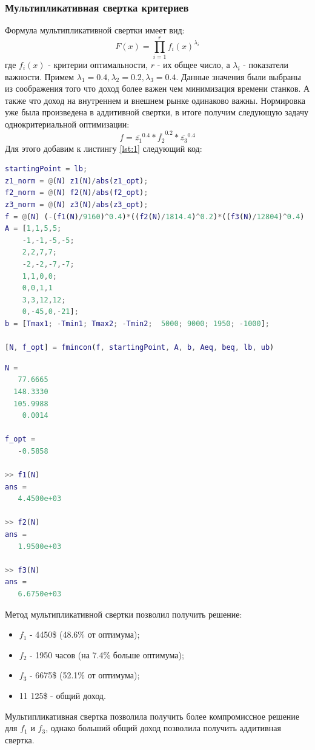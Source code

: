 \subsubsection{Мультипликативная свертка критериев}
Формула мультипликативной свертки имеет вид:
\begin{equation}
F(x) = \prod_{i=1}^{r}f_i(x)^{\lambda_i}
\end{equation}
где $f_i(x)$ - критерии оптимальности, $r$ - их общее число, а $\lambda_i$ - показатели важности. Примем $\lambda_1=0.4, \lambda_2=0.2, \lambda_3=0.4$. Данные значения были выбраны из соображения того что доход более важен чем минимизация времени станков. А также что доход на внутреннем и внешнем рынке одинаково важны.  Нормировка уже была произведена в аддитивной свертки, в итоге получим следующую задачу однокритериальной оптимизации:
\begin{equation}
f = \overline{z_1}^{0.4}*\overline{f_2}^{0.2}*\overline{z_3}^{0.4}
\end{equation}
Для этого добавим к листингу \ref{lst:1} следующий код:
\begin{lstlisting}[language={matlab}, caption={Мультипликативная свертка}, label={lst:mult}]
% Мультипликативная свертка
startingPoint = lb;
z1_norm = @(N) z1(N)/abs(z1_opt);
f2_norm = @(N) f2(N)/abs(f2_opt);
z3_norm = @(N) z3(N)/abs(z3_opt);
f = @(N) (-(f1(N)/9160)^0.4)*((f2(N)/1814.4)^0.2)*((f3(N)/12804)^0.4)
A = [1,1,5,5;
    -1,-1,-5,-5;
    2,2,7,7;
    -2,-2,-7,-7;
    1,1,0,0;
    0,0,1,1
    3,3,12,12;
    0,-45,0,-21];
b = [Tmax1; -Tmin1; Tmax2; -Tmin2;  5000; 9000; 1950; -1000];

[N, f_opt] = fmincon(f, startingPoint, A, b, Aeq, beq, lb, ub)
\end{lstlisting}
\begin{lstlisting}[language={matlab}, caption={Результаты выполнения листинга \ref{lst:mult}}]
N =
   77.6665
  148.3330
  105.9988
    0.0014

f_opt =
   -0.5858

>> f1(N)
ans =
   4.4500e+03

>> f2(N)
ans =
   1.9500e+03

>> f3(N)
ans =
   6.6750e+03
\end{lstlisting}
Метод мультипликативной свертки позволил получить решение:
\begin{itemize}
\item $f_1$ - 4450\$ (48.6\% от оптимума);
\item $f_2$ - 1950 часов (на 7.4\% больше оптимума);
\item $f_3$ - 6675\$ (52.1\% от оптимума);
\item 11 125\$ - общий доход.
\end{itemize}
Мультипликативная свертка позволила получить более компромиссное решение для $f_1$  и $f_3$, однако больший общий доход позволила получить аддитивная свертка.

